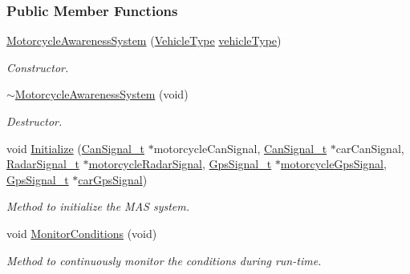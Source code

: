 \subsubsection*{Public Member Functions}
\begin{DoxyCompactItemize}
\item 
\hyperlink{classMotorcycleAwarenessSystem_ab0fb3823809dc056fecc82cc72a80a55}{Motorcycle\-Awareness\-System} (\hyperlink{MotorcycleAwarenessSystemTypes_8hpp_a0c05c42b98a847f971385c81c2a81afa}{Vehicle\-Type} \hyperlink{classMotorcycleAwarenessSystem_a977b2085bfbf6a62902bf2d80160e6d2}{vehicle\-Type})
\begin{DoxyCompactList}\small\item\em Constructor. \end{DoxyCompactList}\item 
\hyperlink{classMotorcycleAwarenessSystem_a89ce16a722b3575e1415cbe9c7eedbd3}{$\sim$\-Motorcycle\-Awareness\-System} (void)
\begin{DoxyCompactList}\small\item\em Destructor. \end{DoxyCompactList}\item 
void \hyperlink{classMotorcycleAwarenessSystem_a55f1ea16b6311120ea42b460fb8b3a71}{Initialize} (\hyperlink{structCanSignal__t}{Can\-Signal\-\_\-t} $\ast$motorcycle\-Can\-Signal, \hyperlink{structCanSignal__t}{Can\-Signal\-\_\-t} $\ast$car\-Can\-Signal, \hyperlink{structRadarSignal__t}{Radar\-Signal\-\_\-t} $\ast$\hyperlink{classMotorcycleAwarenessSystem_a0744e71b9f440a86f5078c876ba7629b}{motorcycle\-Radar\-Signal}, \hyperlink{structGpsSignal__t}{Gps\-Signal\-\_\-t} $\ast$\hyperlink{classMotorcycleAwarenessSystem_ab281a3993b574923b2f379ed0477b2d4}{motorcycle\-Gps\-Signal}, \hyperlink{structGpsSignal__t}{Gps\-Signal\-\_\-t} $\ast$\hyperlink{classMotorcycleAwarenessSystem_a9a8185e00b60d0be58bfa76166063128}{car\-Gps\-Signal})
\begin{DoxyCompactList}\small\item\em Method to initialize the M\-A\-S system. \end{DoxyCompactList}\item 
void \hyperlink{classMotorcycleAwarenessSystem_afb19e832c17d43941d9ed6c4f4435a2e}{Monitor\-Conditions} (void)
\begin{DoxyCompactList}\small\item\em Method to continuously monitor the conditions during run-\/time. \end{DoxyCompactList}\end{DoxyCompactItemize}
